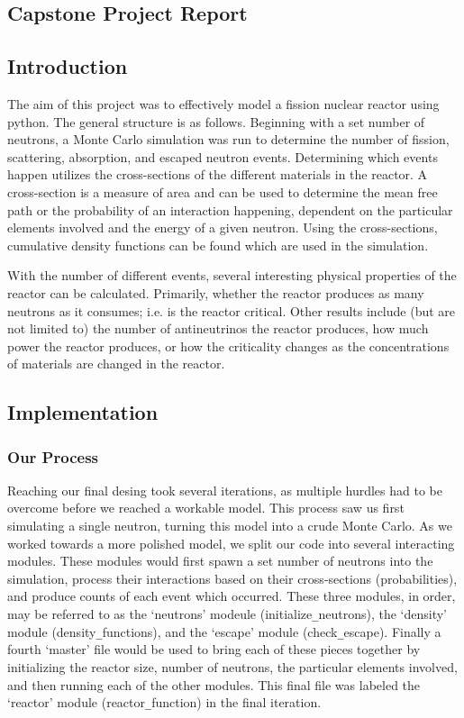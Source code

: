 \documentclass{notes}
\begin{document}
\subsection*{Capstone Project Report}

\subsection*{Introduction}

The aim of this project was to effectively model a fission nuclear reactor using python. The general structure is as follows. Beginning with a set number of neutrons, a Monte Carlo simulation was run to determine the number of fission, scattering, absorption, and escaped neutron events. Determining which events happen utilizes the cross-sections of the different materials in the reactor. A cross-section is a measure of area and can be used to determine the mean free path or the probability of an interaction happening, dependent on the particular elements involved and the energy of a given neutron. Using the cross-sections, cumulative density functions can be found which are used in the simulation. 

With the number of different events, several interesting physical properties of the reactor can be calculated. Primarily, whether the reactor produces as many neutrons as it consumes; i.e. is the reactor critical. Other results include (but are not limited to) the number of antineutrinos the reactor produces, how much power the reactor produces, or how the criticality changes as the concentrations of materials are changed in the reactor.

\subsection*{Implementation}

\subsubsection*{Our Process}

Reaching our final desing took several iterations, as multiple hurdles had to be overcome before we reached a workable model. This process saw us first simulating a single neutron, turning this model into a crude Monte Carlo. As we worked towards a more polished model, we split our code into several interacting modules. These modules would first spawn a set number of neutrons into the simulation, process their interactions based on their cross-sections (probabilities), and produce counts of each event which occurred. These three modules, in order, may be referred to as the `neutrons' modeule (initialize\verb|_|neutrons), the `density' module (density\verb|_|functions), and the `escape' module (check\verb|_|escape). Finally a fourth `master' file would be used to bring each of these pieces together by initializing the reactor size, number of neutrons, the particular elements involved, and then running each of the other modules. This final file was labeled the `reactor' module (reactor\verb|_|function) in the final iteration.
\end{document}
